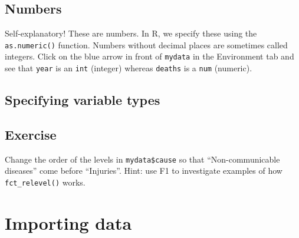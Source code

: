 \documentclass[]{book}
\makeatletter
\newenvironment{Shaded}{\begin{snugshade}}{\end{snugshade}}
\newcommand{\KeywordTok}[1]{\textcolor[rgb]{0.13,0.29,0.53}{\textbf{#1}}}
\newcommand{\StringTok}[1]{\textcolor[rgb]{0.31,0.60,0.02}{#1}}
\newcommand{\CommentTok}[1]{\textcolor[rgb]{0.56,0.35,0.01}{\textit{#1}}}
\newcommand{\OperatorTok}[1]{\textcolor[rgb]{0.81,0.36,0.00}{\textbf{#1}}}
\newcommand{\NormalTok}[1]{#1}
\newenvironment{kframe}{%
\medskip{}
\setlength{\fboxsep}{.8em}
 \def\at@end@of@kframe{}%
 \ifinner\ifhmode%
  \def\at@end@of@kframe{\end{minipage}}%
  \begin{minipage}{\columnwidth}%
 \fi\fi%
 \def\FrameCommand##1{\hskip\@totalleftmargin \hskip-\fboxsep
 \colorbox{shadecolor}{##1}\hskip-\fboxsep
     \hskip-\linewidth \hskip-\@totalleftmargin \hskip\columnwidth}%
 \MakeFramed {\advance\hsize-\width
   \@totalleftmargin\z@ \linewidth\hsize
   \@setminipage}}%
 {\par\unskip\endMakeFramed%
 \at@end@of@kframe}
\renewenvironment{Shaded}{\begin{kframe}}{\end{kframe}}
\makeatother
\begin{document}
\subsection{Numbers}\label{numbers}

Self-explanatory! These are numbers. In R, we specify these using the
\texttt{as.numeric()} function. Numbers without decimal places are
sometimes called integers. Click on the blue arrow in front of
\texttt{mydata} in the Environment tab and see that \texttt{year} is an
\texttt{int} (integer) whereas \texttt{deaths} is a \texttt{num}
(numeric).

\subsection{Specifying variable types}\label{specifying-variable-types}

\begin{Shaded}
\end{Shaded}

\subsection{Exercise}\label{exercise-9}

Change the order of the levels in \texttt{mydata\$cause} so that
``Non-communicable diseases'' come before ``Injuries''. Hint: use F1 to
investigate examples of how \texttt{fct\_relevel()} works.

\section{Importing data}\label{importing-data}
\end{document}
